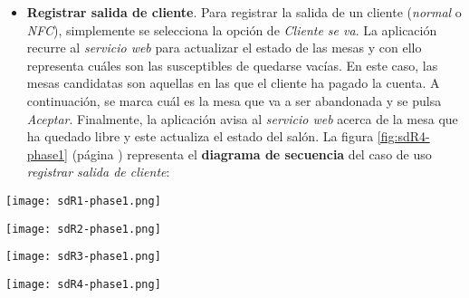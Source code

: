 \begin{itemize}
\item \textbf{Registrar salida de cliente}. Para registrar la salida de un
cliente (\emph{normal} o \emph{\acs{NFC}}), simplemente se selecciona la
opción de \emph{Cliente se va}. La aplicación recurre al \emph{servicio web}
para actualizar el estado de las mesas y con ello representa cuáles son las
susceptibles de quedarse vacías. En este caso, las mesas candidatas son
aquellas en las que el cliente ha pagado la cuenta. A continuación, se marca
cuál es la mesa que va a ser abandonada y se pulsa \emph{Aceptar}. Finalmente,
la aplicación avisa al \emph{servicio web} acerca de la mesa que ha quedado
libre y este actualiza el estado del salón. La figura \ref{fig:sdR4-phase1}
(página \pageref{fig:sdR4-phase1}) representa el \textbf{diagrama de secuencia}
del caso de uso \emph{registrar salida de cliente}:

\end{itemize}

  \begin{sidewaysfigure}[h]
    \begin{center}
      \texttt{[image: sdR1-phase1.png]}
      \caption{Diagrama de secuencia del caso de uso \emph{iniciar nueva
      jornada}.}
      \label{fig:sdR1-phase1}
    \end{center}
  \end{sidewaysfigure}

  \begin{sidewaysfigure}[h]
    \begin{center}
      \texttt{[image: sdR2-phase1.png]}
      \caption{Diagrama de secuencia del caso de uso \emph{iniciar jornada
      existente}.}
      \label{fig:sdR2-phase1}
    \end{center}
  \end{sidewaysfigure}

  \begin{sidewaysfigure}[h]
    \begin{center}
      \texttt{[image: sdR3-phase1.png]}
      \caption{Diagrama de secuencia del caso de uso \emph{registrar llegada
      de cliente}.}
      \label{fig:sdR3-phase1}
    \end{center}
  \end{sidewaysfigure}

  \begin{sidewaysfigure}[h]
    \begin{center}
      \texttt{[image: sdR4-phase1.png]}
      \caption{Diagrama de secuencia del caso de uso \emph{registrar salida
      de cliente}.}
      \label{fig:sdR4-phase1}
    \end{center}
  \end{sidewaysfigure}

